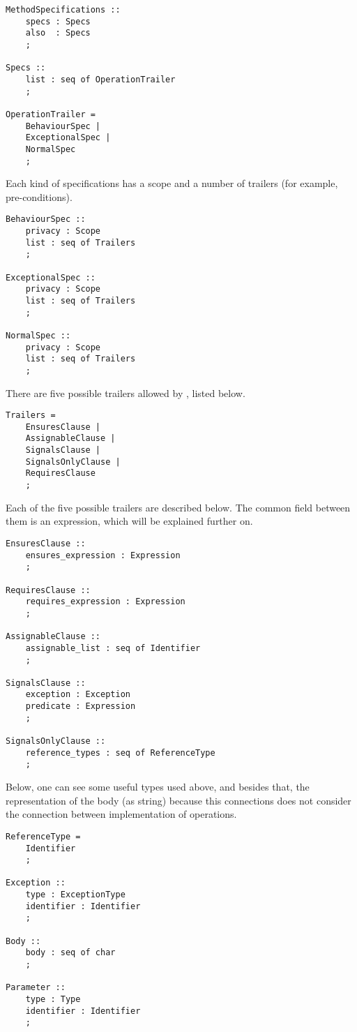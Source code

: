 \medskip
\begin{lstlisting}
MethodSpecifications ::
	specs : Specs
	also  : Specs
	;
	
Specs ::
	list : seq of OperationTrailer
	;

OperationTrailer =
	BehaviourSpec |
	ExceptionalSpec |
	NormalSpec
	;
\end{lstlisting}
\medskip
Each kind of specifications has a scope and a number of trailers (for example, pre-conditions).
\medskip
\begin{lstlisting}
BehaviourSpec ::
	privacy : Scope
	list : seq of Trailers
	;

ExceptionalSpec :: 
	privacy : Scope
	list : seq of Trailers
	;
	
NormalSpec :: 
	privacy : Scope
	list : seq of Trailers
	;
\end{lstlisting}
\medskip
There are five possible trailers allowed by \jml, listed below.
\medskip
\begin{lstlisting}	
Trailers =
	EnsuresClause |
	AssignableClause | 
	SignalsClause |
	SignalsOnlyClause | 
	RequiresClause
	;
\end{lstlisting}
\medskip
Each of the five possible trailers are described below. The common field between them is an expression, which will be explained further on.
\medskip
\begin{lstlisting}
EnsuresClause ::
	ensures_expression : Expression
	;
	
RequiresClause ::
	requires_expression : Expression
	;
	
AssignableClause ::
	assignable_list : seq of Identifier
	;
	
SignalsClause ::
	exception : Exception
	predicate : Expression
	;

SignalsOnlyClause ::
	reference_types : seq of ReferenceType
	;
\end{lstlisting}
\medskip
Below, one can see some useful types used above, and besides that, the representation of the body (as string) because this connections does not consider the connection between implementation of operations.
\medskip
\begin{lstlisting}
ReferenceType = 
	Identifier 
	;

Exception ::
	type : ExceptionType
	identifier : Identifier
	;

Body :: 
	body : seq of char
	;

Parameter :: 
	type : Type
	identifier : Identifier
	;
\end{lstlisting}


